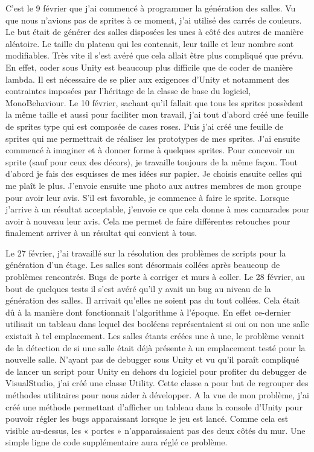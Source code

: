 \documentclass[]{extarticle}
\begin{document}
\begin{spacing}{1.25}
\bigbreak
\bigbreak
C'est le 9 février que j’ai commencé à programmer la génération des salles. Vu que nous n'avions pas de sprites à ce moment, j'ai utilisé des carrés de couleurs. Le but était de générer des salles disposées les unes à côté des autres de manière aléatoire. Le taille du plateau qui les contenait, leur taille et leur nombre sont modifiables. Très vite il s'est avéré que cela allait être plus compliqué que prévu. En effet, coder sous Unity est beaucoup plus difficile que de coder de manière lambda. Il est nécessaire de se plier aux exigences d'Unity et notamment des contraintes imposées par l'héritage de la classe de base du logiciel, MonoBehaviour.
\bigbreak
Le 10 février, sachant qu'il fallait que tous les sprites possèdent la même taille et aussi pour faciliter mon travail, j'ai tout d’abord créé une feuille de sprites type qui est composée de cases roses. Puis j'ai créé une feuille de sprites qui me permettrait de réaliser les prototypes de mes sprites. J'ai ensuite commencé à imaginer et à donner forme à quelques sprites. Pour concevoir un sprite (sauf pour ceux des décors), je travaille toujours de la même façon. Tout d'abord je fais des esquisses de mes idées sur papier. Je choisis ensuite celles qui me plaît le plus. J’envoie ensuite une photo aux autres membres de mon groupe pour avoir leur avis. S'il est favorable, je commence à faire le sprite. Lorsque j’arrive à un résultat acceptable, j’envoie ce que cela donne à mes camarades pour avoir à nouveau leur avis. Cela me permet de faire différentes retouches pour finalement arriver à un résultat qui convient à tous.
\bigbreak

\bigbreak
\bigbreak

Le 27 février, j'ai travaillé sur la résolution des problèmes de scripts pour la génération d’un étage. Les salles sont désormais collées après beaucoup de problèmes rencontrés. Bugs de porte à corriger et murs à coller.
\bigbreak
Le 28 février, au bout de quelques tests il s'est avéré qu'il y avait un bug au niveau de la génération des salles. Il arrivait qu'elles ne soient pas du tout collées. Cela était dû à la manière dont fonctionnait l’algorithme à l’époque. En effet ce-dernier utilisait un tableau dans lequel des booléens représentaient si oui ou non une salle existait à tel emplacement. Les salles étants créées une à une, le problème venait de la détection de si une salle était déjà présente à un emplacement testé pour la nouvelle salle. N’ayant pas de debugger sous Unity et vu qu'il paraît compliqué de lancer un script pour Unity en dehors du logiciel pour profiter du debugger de VisualStudio, j’ai créé une classe Utility. Cette classe a pour but de regrouper des méthodes utilitaires pour nous aider à développer. A la vue de mon problème, j'ai créé une méthode permettant d’afficher un tableau dans la console d'Unity pour pouvoir régler les bugs apparaissant lorsque le jeu est lancé. 
\bigbreak
Comme cela est visible au-dessus, les « portes » n’apparaissaient pas des deux côtés du mur. Une simple ligne de code supplémentaire aura réglé ce problème.
\newpage


\end{spacing}
\end{document}
